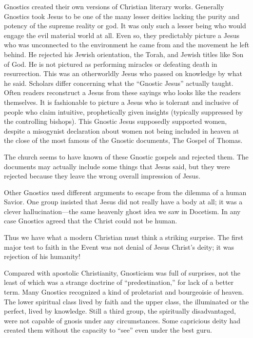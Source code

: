 Gnostics created their own versions of Christian literary works. Generally Gnostics took Jesus to be
one of the many lesser deities lacking the purity and potency of the supreme reality or god. It was
only such a lesser being who would engage the evil material world at all. Even so, they predictably
picture a Jesus who was unconnected to the environment he came from and the movement he left behind.
He rejected his Jewish orientation, the Torah, and Jewish titles like Son of God. He is not pictured
as performing miracles or defeating death in resurrection. This was an otherworldly Jesus who passed
on knowledge by what he said. Scholars differ concerning what the “Gnostic Jesus” actually taught.
Often readers reconstruct a Jesus from these sayings who looks like the readers themselves. It is
fashionable to picture a Jesus who is tolerant and inclusive of people who claim intuitive,
prophetically given insights (typically suppressed by the controlling bishops). This Gnostic Jesus
supposedly supported women, despite a misogynist declaration about women not being included in
heaven at the close of the most famous of the Gnostic documents, The Gospel of Thomas.

The church seems to have known of these Gnostic gospels and rejected them. The documents may
actually include some things that Jesus said, but they were rejected because they leave the wrong
overall impression of Jesus.

Other Gnostics used different arguments to escape from the dilemma of a human Savior. One group
insisted that Jesus did not really have a body at all; it was a clever hallucination—the same
heavenly ghost idea we saw in Docetism. In any case Gnostics agreed that the Christ could not be
human.

Thus we have what a modern Christian must think a striking surprise. The first major test to faith
in the Event was not denial of Jesus Christ’s deity; it was rejection of his humanity!

Compared with apostolic Christianity, Gnosticism was full of surprises, not the least of which was a
strange doctrine of “predestination,” for lack of a better term. Many Gnostics recognized a kind of
proletariat and bourgeoisie of heaven. The lower spiritual class lived by faith and the upper class,
the illuminated or the perfect, lived by knowledge. Still a third group, the spiritually
disadvantaged, were not capable of gnosis under any circumstances. Some capricious deity had created
them without the capacity to “see” even under the best guru.

